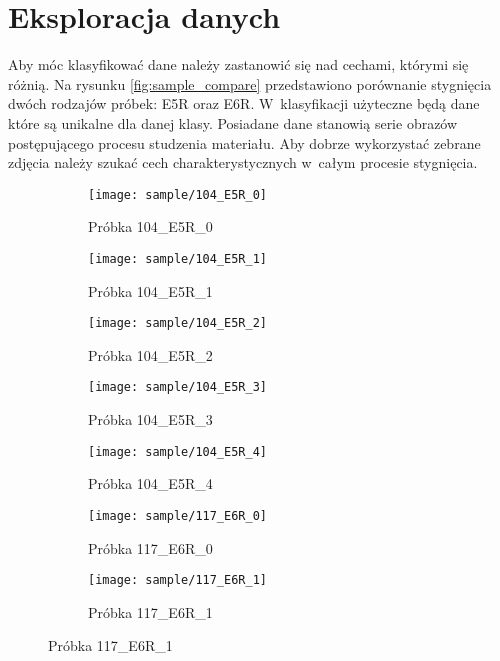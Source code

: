 \section{Eksploracja danych}
Aby móc klasyfikować dane należy zastanowić się nad cechami, którymi się
różnią.
Na rysunku \ref{fig:sample_compare} przedstawiono porównanie stygnięcia
dwóch rodzajów próbek: E5R oraz E6R.
W~klasyfikacji użyteczne będą dane które są unikalne dla danej klasy.
Posiadane dane stanowią serie obrazów postępującego procesu studzenia
materiału.
Aby dobrze wykorzystać zebrane zdjęcia należy szukać cech charakterystycznych
w~całym procesie stygnięcia.
\begin{figure}[htbp]
	\centering
	\begin{subfigure}{0.3\textwidth}
		\centering
		\texttt{[image: sample/104\_E5R\_0]}
		\caption{Próbka 104\_E5R\_0}
	\end{subfigure}
	\hspace{0.25cm}
	\vspace{0.5cm}
	\begin{subfigure}{0.3\textwidth}
		\centering
		\texttt{[image: sample/104\_E5R\_1]}
		\caption{Próbka 104\_E5R\_1}
	\end{subfigure}
	\hspace{0.25cm}
	\begin{subfigure}{0.3\textwidth}
		\centering
		\texttt{[image: sample/104\_E5R\_2]}
		\caption{Próbka 104\_E5R\_2}
	\end{subfigure}
	\begin{subfigure}{0.3\textwidth}
		\centering
		\texttt{[image: sample/104\_E5R\_3]}
		\caption{Próbka 104\_E5R\_3}
	\end{subfigure}
	\hspace{0.25cm}
	\vspace{0.5cm}
	\begin{subfigure}{0.3\textwidth}
		\centering
		\texttt{[image: sample/104\_E5R\_4]}
		\caption{Próbka 104\_E5R\_4}
	\end{subfigure}
	\hspace{0.25cm}
	\begin{subfigure}{0.3\textwidth}
		\centering
		\texttt{[image: sample/117\_E6R\_0]}
		\caption{Próbka 117\_E6R\_0}
	\end{subfigure}
	\begin{subfigure}{0.3\textwidth}
		\centering
		\texttt{[image: sample/117\_E6R\_1]}
		\caption{Próbka 117\_E6R\_1}

\end{subfigure}
\end{figure}
